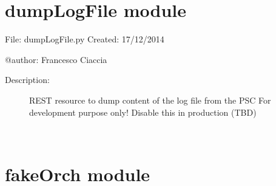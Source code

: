 \documentclass[letterpaper,10pt,oneside]{sphinxmanual}
\begin{document}
\chapter{dumpLogFile module}
\label{dumpLogFile:module-dumpLogFile}\label{dumpLogFile::doc}\label{dumpLogFile:dumplogfile-module}
File:       dumpLogFile.py
Created:    17/12/2014

@author:    Francesco Ciaccia
\begin{description}
\item[{Description:}] \leavevmode
REST resource to dump content of the log file from the PSC
For development purpose only! Disable this in production (TBD)

\end{description}

\begin{fulllineitems}
\label{dumpLogFile:dumpLogFile.dumpLogFile}~

\begin{fulllineitems}
\label{dumpLogFile:dumpLogFile.dumpLogFile.on_get}
\end{fulllineitems}


\end{fulllineitems}



\chapter{fakeOrch module}
\label{fakeOrch::doc}\label{fakeOrch:fakeorch-module}\label{fakeOrch:module-fakeOrch}

\begin{fulllineitems}
\label{fakeOrch:fakeOrch.createPSA}~

\begin{fulllineitems}
\label{fakeOrch:fakeOrch.createPSA.on_get}
\end{fulllineitems}


\begin{fulllineitems}
\label{fakeOrch:fakeOrch.createPSA.on_put}
\end{fulllineitems}


\end{fulllineitems}
\end{document}
